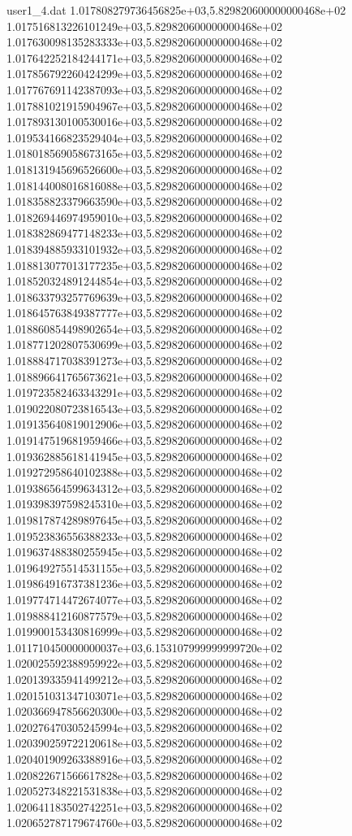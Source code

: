 \begin{filecontents}{user1_4.dat}
1.017808279736456825e+03,5.829820600000000468e+02
1.017516813226101249e+03,5.829820600000000468e+02
1.017630098135283333e+03,5.829820600000000468e+02
1.017642252184244171e+03,5.829820600000000468e+02
1.017856792260424299e+03,5.829820600000000468e+02
1.017767691142387093e+03,5.829820600000000468e+02
1.017881021915904967e+03,5.829820600000000468e+02
1.017893130100530016e+03,5.829820600000000468e+02
1.019534166823529404e+03,5.829820600000000468e+02
1.018018569058673165e+03,5.829820600000000468e+02
1.018131945696526600e+03,5.829820600000000468e+02
1.018144008016816088e+03,5.829820600000000468e+02
1.018358823379663590e+03,5.829820600000000468e+02
1.018269446974959010e+03,5.829820600000000468e+02
1.018382869477148233e+03,5.829820600000000468e+02
1.018394885933101932e+03,5.829820600000000468e+02
1.018813077013177235e+03,5.829820600000000468e+02
1.018520324891244854e+03,5.829820600000000468e+02
1.018633793257769639e+03,5.829820600000000468e+02
1.018645763849387777e+03,5.829820600000000468e+02
1.018860854498902654e+03,5.829820600000000468e+02
1.018771202807530699e+03,5.829820600000000468e+02
1.018884717038391273e+03,5.829820600000000468e+02
1.018896641765673621e+03,5.829820600000000468e+02
1.019723582463343291e+03,5.829820600000000468e+02
1.019022080723816543e+03,5.829820600000000468e+02
1.019135640819012906e+03,5.829820600000000468e+02
1.019147519681959466e+03,5.829820600000000468e+02
1.019362885618141945e+03,5.829820600000000468e+02
1.019272958640102388e+03,5.829820600000000468e+02
1.019386564599634312e+03,5.829820600000000468e+02
1.019398397598245310e+03,5.829820600000000468e+02
1.019817874289897645e+03,5.829820600000000468e+02
1.019523836556388233e+03,5.829820600000000468e+02
1.019637488380255945e+03,5.829820600000000468e+02
1.019649275514531155e+03,5.829820600000000468e+02
1.019864916737381236e+03,5.829820600000000468e+02
1.019774714472674077e+03,5.829820600000000468e+02
1.019888412160877579e+03,5.829820600000000468e+02
1.019900153430816999e+03,5.829820600000000468e+02
1.011710450000000037e+03,6.153107999999999720e+02
1.020025592388959922e+03,5.829820600000000468e+02
1.020139335941499212e+03,5.829820600000000468e+02
1.020151031347103071e+03,5.829820600000000468e+02
1.020366947856620300e+03,5.829820600000000468e+02
1.020276470305245994e+03,5.829820600000000468e+02
1.020390259722120618e+03,5.829820600000000468e+02
1.020401909263388916e+03,5.829820600000000468e+02
1.020822671566617828e+03,5.829820600000000468e+02
1.020527348221531838e+03,5.829820600000000468e+02
1.020641183502742251e+03,5.829820600000000468e+02
1.020652787179674760e+03,5.829820600000000468e+02

\end{filecontents}
